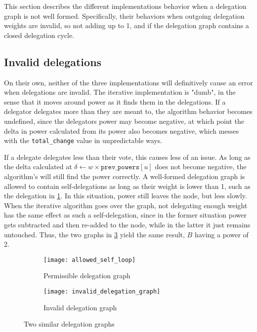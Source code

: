 This section describes the different implementations behavior when a delegation graph is not well formed. Specifically, their behaviors when outgoing delegation weights are invalid, so not adding up to 1, and if the delegation graph contains a closed delegation cycle. 

\subsection{Invalid delegations}

On their own, neither of the three implementations will definitively cause an error when delegations are invalid. The iterative implementation is "dumb", in the sense that it moves around power as it finds them in the delegations. If a delegator delegates more than they are meant to, the algorithm behavior becomes undefined, since the delegators power may become negative, at which point the delta in power calculated from its power also becomes negative, which messes with the \texttt{total\_change} value in unpredictable ways. 

If a delegate delegates less than their vote, this causes less of an issue. As long as the delta calculated at $\delta \gets w \times \texttt{prev\_powers}[u]$ does not become negative, the algorithm's will still find the power correctly. A well-formed delegation graph is allowed to contain self-delegations as long as their weight is lower than 1, such as the delegation in \cref{subfig:permissible-self-delegation}. In this situation, power still leaves the node, but less slowly. When the iterative algorithm goes over the graph, not delegating enough weight has the same effect as such a self-delegation, since in the former situation  power gets subtracted and then re-added to the node, while in the latter it just remains untouched. Thus, the two graphs in \cref{fig:small-delegation-graphs} yield the same result, $B$ having a power of 2.

\begin{figure}[t]
    \centering
    \begin{subfigure}[t]{0.45\textwidth}
	\centering
	\texttt{[image: allowed\_self\_loop]}
	\caption{Permissible delegation graph}
	\label{subfig:permissible-self-delegation}
    \end{subfigure}
    \hfill
    \begin{subfigure}[t]{0.45\textwidth}
        \centering
        \texttt{[image: invalid\_delegation\_graph]}
        \caption{Invalid delegation graph}
         \label{subfig:invalid-delegation-graph} 
    \end{subfigure}
    \caption{Two similar delegation graphs}
    \label{fig:small-delegation-graphs}
\end{figure}

